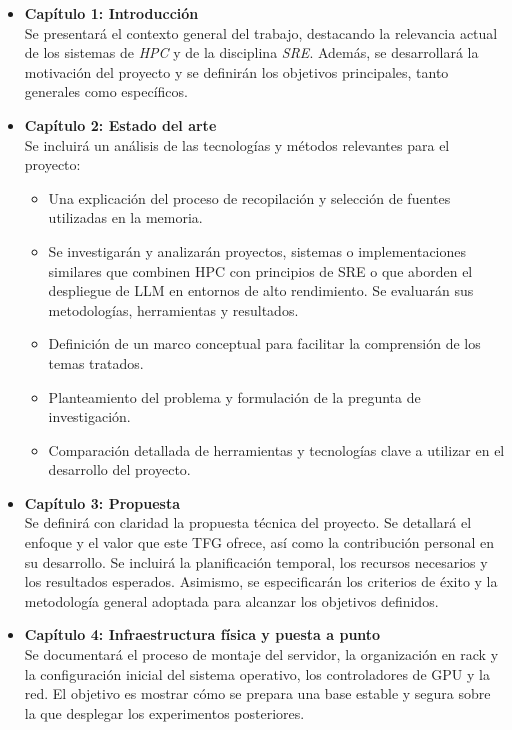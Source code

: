 \begin{itemize}
    \item \textbf{Capítulo 1: Introducción}\\
    Se presentará el contexto general del trabajo, destacando la relevancia actual de los sistemas de \textit{HPC} y de la disciplina \textit{SRE}. Además, se desarrollará la motivación del proyecto y se definirán los objetivos principales, tanto generales como específicos.
    \item \textbf{Capítulo 2: Estado del arte}\\
    Se incluirá un análisis de las tecnologías y métodos relevantes para el proyecto:
    \begin{itemize}
        \item Una explicación del proceso de recopilación y selección de fuentes utilizadas en la memoria.
        \item Se investigarán y analizarán proyectos, sistemas o implementaciones similares que combinen HPC con principios de SRE o que aborden el despliegue de LLM en entornos de alto rendimiento. Se evaluarán sus metodologías, herramientas y resultados.
        \item Definición de un marco conceptual para facilitar la comprensión de los temas tratados.
        \item Planteamiento del problema y formulación de la pregunta de investigación.
        \item Comparación detallada de herramientas y tecnologías clave a utilizar en el desarrollo del proyecto.
    \end{itemize}
    \item \textbf{Capítulo 3: Propuesta}\\
    Se definirá con claridad la propuesta técnica del proyecto. Se detallará el enfoque y el valor que este TFG ofrece, así como la contribución personal en su desarrollo. Se incluirá la planificación temporal, los recursos necesarios y los resultados esperados. Asimismo, se especificarán los criterios de éxito y la metodología general adoptada para alcanzar los objetivos definidos.
    \item \textbf{Capítulo 4: Infraestructura física y puesta a punto}\\
    Se documentará el proceso de montaje del servidor, la organización en rack y la configuración inicial del sistema operativo, los controladores de GPU y la red. El objetivo es mostrar cómo se prepara una base estable y segura sobre la que desplegar los experimentos posteriores.

\end{itemize}
